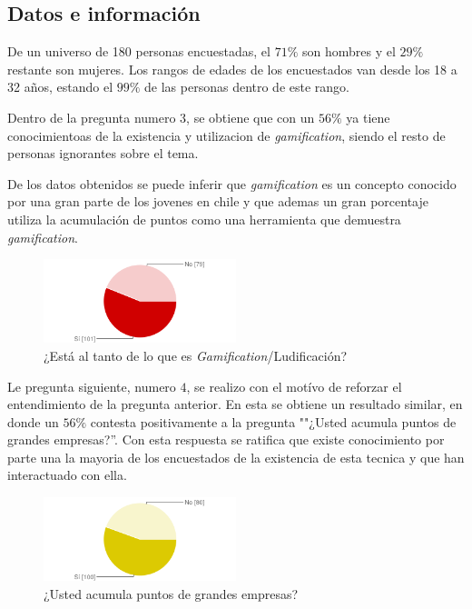 \subsection{Datos e información}

De un universo de 180 personas encuestadas, el $71\%$ son hombres y el $29\%$ restante son mujeres. 
Los rangos de edades de los encuestados van desde los 18 a 32 años, estando el $99\%$ de las personas
dentro de este rango.

Dentro de la pregunta numero 3, se obtiene que con un $56\%$ ya tiene conocimientoas de la existencia
y utilizacion de \emph{gamification}, siendo el resto de personas ignorantes sobre el tema. 

De los datos obtenidos se puede inferir que \emph{gamification} es un concepto conocido por una gran parte
de los jovenes en chile y que ademas un gran porcentaje utiliza la acumulación de puntos como una
herramienta que demuestra \emph{gamification}.

\begin{figure}[!htb]
  \centering
  \includegraphics[width=0.5\textwidth]{images/chartPreg3.png}
  \caption[chart3]{¿Está al tanto de lo que es \emph{Gamification}/Ludificación?}
  \label{fig:chart1}
\end{figure}

Le pregunta siguiente, numero $4$, se realizo con el motívo de reforzar el entendimiento de la pregunta 
anterior. En esta se obtiene un resultado similar, en donde un $56\%$ contesta positivamente a la 
pregunta ""¿Usted acumula puntos de grandes empresas?''. Con esta respuesta se ratifica que existe 
conocimiento por parte una la mayoria de los encuestados de la existencia de esta tecnica y que han 
interactuado con ella.

\begin{figure}[!htb]
  \centering
  \includegraphics[width=0.5\textwidth]{images/chartPreg4.png}
  \caption[chart4]{¿Usted acumula puntos de grandes empresas?}
  \label{fig:chart2}
\end{figure}

